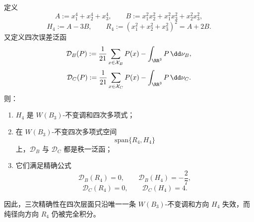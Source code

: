 \begin{theorem}\label{thm:window6-b3c3-quartic-rankone-harmonic-detector}
定义
\[
A:=x_1^4+x_2^4+x_3^4,
\qquad
B:=x_1^2x_2^2+x_1^2x_3^2+x_2^2x_3^2,
\]
\[
H_4:=A-3B,
\qquad
R_4:=(x_1^2+x_2^2+x_3^2)^2=A+2B.
\]
又定义四次误差泛函
\[
\mathcal D_B(P):=\frac1{21}\sum_{x\in\mathcal X_B}P(x)-\int_{\RR^3}P\,\dd\nu_B,
\]
\[
\mathcal D_C(P):=\frac1{21}\sum_{x\in\mathcal X_C}P(x)-\int_{\RR^3}P\,\dd\nu_C.
\]
则：
\begin{enumerate}
  \item \(H_4\) 是 \(W(B_3)\)-不变调和四次多项式；
  \item 在 \(W(B_3)\)-不变四次多项式空间
  \[
  \mathrm{span}\{R_4,H_4\}
  \]
  上，\(\mathcal D_B\) 与 \(\mathcal D_C\) 都是秩一泛函；
  \item 它们满足精确公式
  \[
  \mathcal D_B(R_4)=0,\qquad \mathcal D_B(H_4)=-\frac{2}{7},
  \]
  \[
  \mathcal D_C(R_4)=0,\qquad \mathcal D_C(H_4)=4.
  \]
\end{enumerate}
因此，三次精确性在四次层面只沿唯一一条 \(W(B_3)\)-不变调和方向 \(H_4\) 失效，而纯径向方向 \(R_4\) 仍被完全积分。
\end{theorem}

